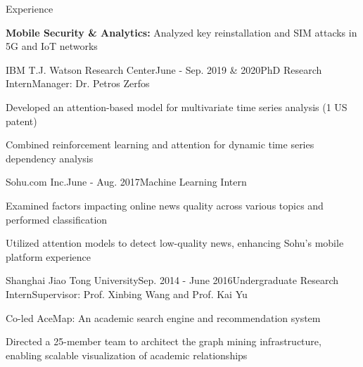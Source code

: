 \documentclass{resume} %
\begin{document}
\begin{rSection}{Experience}
\begin{rSubsection11}
\item \textbf{Mobile Security \& Analytics:} Analyzed key reinstallation and SIM attacks in 5G and IoT networks

\end{rSubsection11}

\begin{rSubsection1}
{IBM T.J. Watson Research Center}{June - Sep. 2019 \& 2020}{PhD Research Intern}{Manager: Dr. Petros Zerfos}
\item Developed an attention-based model for multivariate time series analysis (1 US patent)
\item Combined reinforcement learning and attention for dynamic time series dependency analysis
\end{rSubsection1}

\begin{rSubsection1}
{Sohu.com Inc.}{June - Aug. 2017}{Machine Learning Intern}{}
\item Examined factors impacting online news quality across various topics and performed classification
\item Utilized attention models to detect low-quality news, enhancing Sohu's mobile platform experience
\end{rSubsection1}

\begin{rSubsection1}
{Shanghai Jiao Tong University}{Sep. 2014 - June 2016}{Undergraduate Research Intern}{Supervisor: Prof. Xinbing Wang and Prof. Kai Yu}
\item Co-led AceMap: An academic search engine and recommendation system
\item Directed a 25-member team to architect the graph mining infrastructure, enabling scalable visualization of academic relationships
\end{rSubsection1}

\end{rSection}
\end{document}
